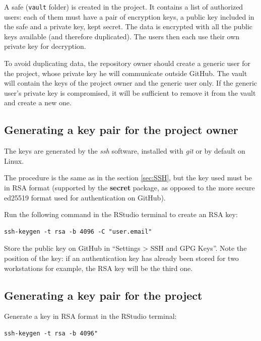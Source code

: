 \documentclass[
  12pt,
  american,
  a4paper,
  extrafontsizes,onecolumn,openright
  ]{memoir}
\begin{document}
A safe (\texttt{vault} folder) is created in the project.
It contains a list of authorized users: each of them must have a pair of encryption keys, a public key included in the safe and a private key, kept secret.
The data is encrypted with all the public keys available (and therefore duplicated).
The users then each use their own private key for decryption.

To avoid duplicating data, the repository owner should create a generic user for the project, whose private key he will communicate outside GitHub.
The vault will contain the keys of the project owner and the generic user only.
If the generic user's private key is compromised, it will be sufficient to remove it from the vault and create a new one.

\subsection{Generating a key pair for the project owner}\label{generating-a-key-pair-for-the-project-owner}

The keys are generated by the \emph{ssh} software, installed with \emph{git} or by default on Linux.

The procedure is the same as in the section \ref{sec:SSH}, but the key used must be in RSA format (supported by the \textbf{secret} package, as opposed to the more secure ed25519 format used for authentication on GitHub).

Run the following command in the RStudio terminal to create an RSA key:

\begin{verbatim}
ssh-keygen -t rsa -b 4096 -C "user.email"
\end{verbatim}

Store the public key on GitHub in \enquote{Settings \textgreater{} SSH and GPG Keys}.
Note the position of the key: if an authentication key has already been stored for two workstations for example, the RSA key will be the third one.

\subsection{Generating a key pair for the project}\label{generating-a-key-pair-for-the-project}

Generate a key in RSA format in the RStudio terminal:

\begin{verbatim}
ssh-keygen -t rsa -b 4096" 
\end{verbatim}
\end{document}
